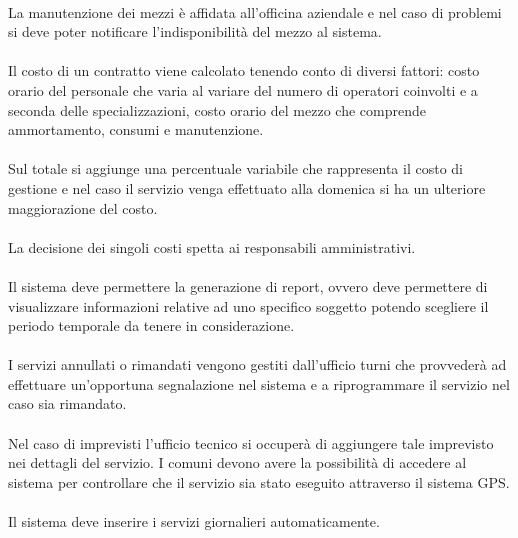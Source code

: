 \documentclass[green, fancy, 11pt]{elegantbook}
\begin{document}
\\
La manutenzione dei mezzi è affidata all’officina aziendale e nel caso di problemi si deve poter notificare l’indisponibilità del mezzo al sistema.\\
\\
Il costo di un contratto viene calcolato tenendo conto di diversi fattori: costo orario del personale che varia al variare del numero di operatori coinvolti e a seconda delle specializzazioni, costo orario del mezzo che comprende ammortamento, consumi e manutenzione.\\
\\
Sul totale si aggiunge una percentuale variabile che rappresenta il costo di gestione e nel caso il servizio venga effettuato alla domenica si ha un ulteriore maggiorazione del costo.\\
\\
La decisione dei singoli costi spetta ai responsabili amministrativi.\\
\\
Il sistema deve permettere la generazione di report, ovvero deve permettere di visualizzare informazioni relative ad uno specifico soggetto potendo scegliere il periodo temporale da tenere in considerazione.\\
\\
I servizi annullati o rimandati vengono gestiti dall’ufficio turni che provvederà ad effettuare un’opportuna segnalazione nel sistema e a riprogrammare il servizio nel caso sia rimandato.\\
\\
Nel caso di imprevisti l’ufficio tecnico si occuperà di aggiungere tale imprevisto nei dettagli del servizio.
I comuni devono avere la possibilità di accedere al sistema per controllare che il servizio sia stato eseguito attraverso il sistema GPS.\\
\\
Il sistema deve inserire i servizi giornalieri automaticamente.

\newpage
\end{document}
